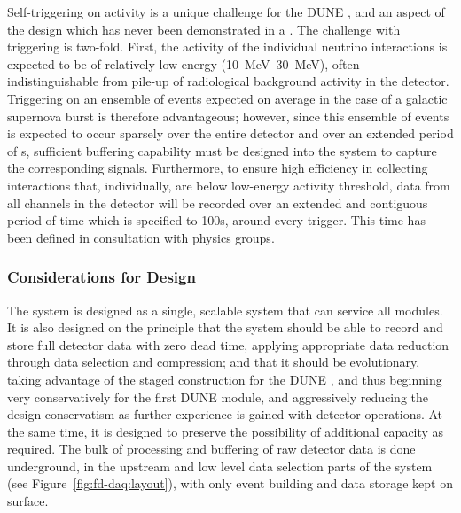 Self-triggering on  activity is a unique challenge for the
DUNE , and an aspect of the design which has never been demonstrated
in a . The challenge with  triggering is two-fold. 
First, the activity of the individual  neutrino interactions
is expected to be of relatively low energy (\SIrange{10}{30}{\mega\electronvolt}),
often indistinguishable from pile-up of radiological background activity in the
detector.  Triggering on an ensemble of  events expected on
average in the case of a galactic supernova burst is therefore
advantageous; however, since this ensemble of events is expected to occur sparsely over the
entire detector and over an extended period of \si{s},
sufficient buffering capability must be designed into the system to
capture the corresponding signals. 
Furthermore, to ensure high efficiency in collecting  interactions
that, individually, are below low-energy activity threshold, data from
all channels in the detector will be recorded over an extended and contiguous period of
time which is specified to 100\si{s}, around every 
trigger. This time has been defined in consultation with 
physics groups.

 

\subsubsection{Considerations for Design}
\label{sec:fd-daq:considerations}

The  system is designed as a single, scalable system that can
service all  modules. It is also designed on the principle that the
system should be able to record and store full detector data with zero dead
time, applying appropriate data reduction through data selection and
compression; and that it should be evolutionary, taking advantage of the
staged construction for the DUNE , and thus beginning very
conservatively for the first DUNE  module, and aggressively reducing
the design conservatism as further experience is gained with detector
operations. At the same time, it is designed to preserve the possibility of
additional capacity as required. The bulk of processing and buffering of raw
detector data is done underground, in the upstream  and low
level data selection parts of the
system (see Figure~\ref{fig:fd-daq:layout}), with only event building and data
storage kept on surface.

